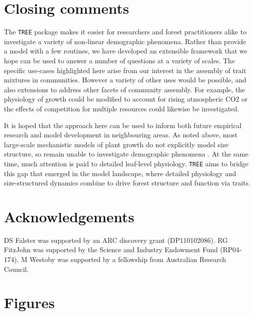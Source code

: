 \documentclass[a4paper,11pt]{article}
\begin{document}
\section{Closing comments}

The \texttt{TREE} package makes it easier for researchers and forest practitioners
alike to investigate a variety of non-linear demographic phenomena.  Rather
than provide a model with a few routines, we have developed an extensible
framework that we hope can be used to answer a number of questions at a
variety of scales. The specific use-cases highlighted here arise from our
interest in the assembly of trait mixtures in communities. However a variety
of other uses would be possible, and also extensions to address other facets
of community assembly. For example,  the physiology of growth could be
modified to account for rising atmospheric CO2 or the effects of competition
for multiple resources could likewise be investigated.

It is hoped that the approach here can be used to inform both future empirical
research and model development in neighbouring areas. As noted above, most
large-scale mechanistic models of plant growth do not explicitly model size
structure, so remain unable to investigate demographic phenomena
\citep{Cramer-2001, Dekauwe-2014, Kelley-2013, Sitch-2003}. At the same time,
much attention is paid to detailed leaf-level physiology. \texttt{TREE} aims to bridge
this gap that emerged in the model landscape, where detailed physiology and
size-structured dynamics combine to drive forest structure and function via
traits.

\section{Acknowledgements}

DS Falster was supported by an ARC discovery grant (DP110102086). RG
FitzJohn was supported by the Science and Industry Endowment Fund
(RP04-174). M Westoby was supported by a fellowship from Australian
Research Council.

\clearpage


\clearpage

\section{Figures}\label{figures}
\end{document}

